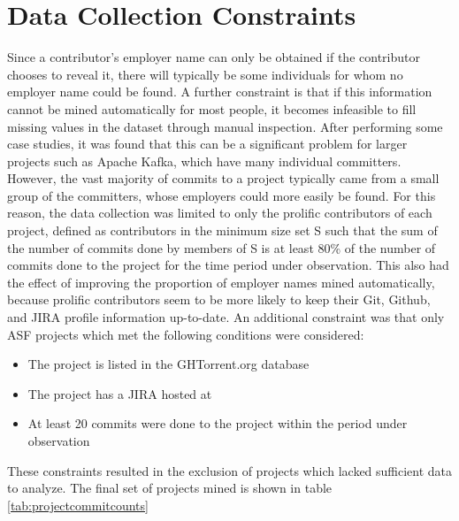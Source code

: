 \section{Data Collection Constraints}
Since a contributor's employer name can only be obtained if the contributor chooses to reveal it, there will typically be some individuals for whom no employer name could be found. A further constraint is that if this information cannot be mined automatically for most people, it becomes infeasible to fill missing values in the dataset through manual inspection. After performing some case studies, it was found that this can be a significant problem for larger projects such as Apache Kafka, which have many individual committers. However, the vast majority of commits to a project typically came from a small group of the committers, whose employers could more easily be found. For this reason, the data collection was limited to only the prolific contributors of each project, defined as contributors in the minimum size set S such that the sum of the number of commits done by members of S is at least 80\% of the number of commits done to the project for the time period under observation. This also had the effect of improving the proportion of employer names mined automatically, because prolific contributors seem to be more likely to keep their Git, Github, and JIRA profile information up-to-date.
An additional constraint was that only ASF projects which met the following conditions were considered:
\begin{itemize}
	\item The project is listed in the GHTorrent.org database
	\item The project has a JIRA hosted at \ASFJIRAURL
	\item At least 20 commits were done to the project within the period under observation
\end{itemize}
These constraints resulted in the exclusion of projects which lacked sufficient data to analyze. The final set of projects mined is shown in table \ref{tab:projectcommitcounts}

